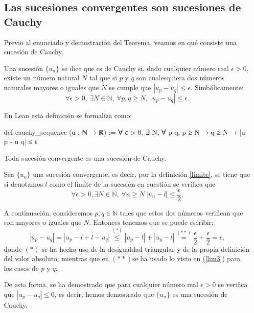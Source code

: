 \subsection{Las sucesiones convergentes son sucesiones de Cauchy}
Previo al enunciado y demostración del Teorema, veamos en qué consiste una sucesión de Cauchy.
\begin{definicion}
	Una sucesión \(\{u_n\}\) se dice que es de Cauchy si, dado cualquier número real \(\epsilon >0\),
	existe un número natural \(N\) tal que si \(p\) y \(q\) son cualesquiera dos números
	naturales mayores o iguales que \(N\) se cumple que \(|u_p-u_q| \leq \epsilon \). 
	Simbólicamente:
	\begin{equation}
	\forall \epsilon >0, \ \exists N \in \mathbb{N}, \ \forall p, q \geq N, \ |u_p-u_q| \leq \epsilon.
	\end{equation}
\end{definicion}
En Lean esta definición se formaliza como:
\begin{leancode}
def cauchy_sequence (u : ℕ → ℝ) := 
∀ ε > 0, ∃ N, ∀ p q, p ≥ N → q ≥ N → |u p - u q| ≤ ε
\end{leancode}
\begin{teorema}
	Toda sucesión convergente es una sucesión de Cauchy.
\end{teorema}
\begin{demostracion}
	Sea \(\{u_n\}\) una sucesión convergente, es decir, por la definición \ref{limite}, se tiene que si denotamos \(l\) como el límite de la sucesión en cuestión se verifica que
\begin{equation}\label{lim3}
\forall \epsilon >0, \exists N \in \mathbb{N}, \  \forall n \geq N \  |u_n-l| \leq \frac{\epsilon}{2}.
\end{equation}

A continuación, consideremos \(p,q \in \mathbb{N}\) tales que estos dos números verifican que
son mayores o iguales que \(N\). Entonces tenemos que se puede escribir:
\begin{equation*}
|u_p-u_q| = |u_p-l+l-u_q| \stackrel{(*)}{\leq} |u_p-l|+|u_q-l|\stackrel{(**)}{=} \frac{\epsilon}{2}+\frac{\epsilon}{2}=\epsilon,
\end{equation*}
donde \( (*) \) se ha hecho uso de la desigualdad triangular y de la propia definición del valor absoluto; mientras que en \((**) \)se ha usado lo visto en (\ref{lim3}) para los casos de \(p\) y \(q\).

De esta forma, se ha demostrado que para cualquier número real \(\epsilon >0\) 
se verifica que \( |u_p-u_q| \leq 0\), es decir, hemos demostrado que \(\{u_n\}\) 
es una sucesión de Cauchy.
\end{demostracion}

